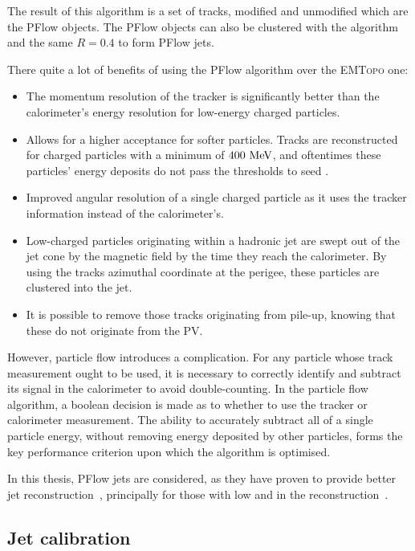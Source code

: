 The result of this algorithm is a set of tracks, modified and unmodified \topos which are the \ac{PFlow} objects. The \ac{PFlow} objects can also be clustered with the \antikt algorithm and the same \(R=0.4\) to form \ac{PFlow} jets.

There quite a lot of benefits of using the \ac{PFlow} algorithm over the \textsc{EMTopo} one:
\begin{itemize}
    \item The momentum resolution of the tracker is significantly better than the calorimeter's energy resolution for low-energy charged particles.
    \item Allows for a higher acceptance for softer particles. Tracks are reconstructed for charged particles with a minimum \pt of \(400~\text{MeV}\), and oftentimes these particles' energy deposits do not pass the thresholds to seed \topos.
    \item Improved angular resolution of a single charged particle as it uses the tracker information instead of the calorimeter's.
    \item Low-\pt charged particles originating within a hadronic jet are swept out of the jet cone by the magnetic field by the time they reach the calorimeter. By using the tracks azimuthal coordinate at the perigee, these particles are clustered into the jet.
    \item It is possible to remove those tracks originating from pile-up, knowing that these do not originate from the \ac{PV}.
\end{itemize}

However, particle flow introduces a complication. For any particle whose track measurement ought to be used, it is necessary to correctly identify and subtract its signal in the calorimeter to avoid double-counting. In the particle flow algorithm, a boolean decision is made as to whether to use the tracker or calorimeter measurement. The ability to accurately subtract all of a single particle energy, without removing energy deposited by other particles, forms the key performance criterion upon which the algorithm is optimised.

In this thesis, \ac{PFlow} jets are considered, as they have proven to provide better jet reconstruction~\cite{ATLAS-JetPFlow-Performance}, principally for those with low \pt and in the \met reconstruction~\cite{ATLAS-MET-Performance-2016}.


\subsection{Jet calibration}

